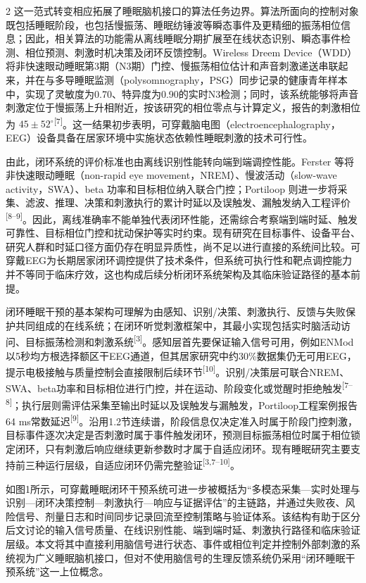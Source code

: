 \documentclass[UTF8,zihao=5,fontset=none]{ctexart}
\newcommand{\hei}{\CJKfamily{hei}}
\newcommand{\leveltwo}[1]{%
  \par\noindent{\hei\fontsize{10.5pt}{12.6pt}\selectfont\mdseries #1\par}}
\newcommand{\refcite}[1]{\nolinebreak[4]\textsuperscript{[#1]}}
\begin{document}
\begin{multicols}{2}
这一范式转变相应拓展了睡眠脑机接口的算法任务边界。算法所面向的控制对象既包括睡眠阶段，也包括慢振荡、睡眠纺锤波等瞬态事件及更精细的振荡相位信息；因此，相关算法的功能需从离线睡眠分期扩展至在线状态识别、瞬态事件检测、相位预测、刺激时机决策及闭环反馈控制。Wireless Dreem Device（WDD）将非快速眼动睡眠第3期（N3期）门控、慢振荡相位估计和声音刺激递送串联起来，并在与多导睡眠监测（polysomnography，PSG）同步记录的健康青年样本中，实现了灵敏度为0.70、特异度为0.90的实时N3检测；同时，该系统能够将声音刺激定位于慢振荡上升相附近，按该研究的相位零点与计算定义，报告的刺激相位为 $45\pm52^{\circ}$\refcite{7}。这一结果初步表明，可穿戴脑电图（electroencephalography，EEG）设备具备在居家环境中实施状态依赖性睡眠刺激的技术可行性。

由此，闭环系统的评价标准也由离线识别性能转向端到端调控性能。Ferster 等将非快速眼动睡眠（non-rapid eye movement，NREM）、慢波活动（slow-wave activity，SWA）、beta 功率和目标相位纳入联合门控；Portiloop 则进一步将采集、滤波、推理、决策和刺激执行的累计时延以及误触发、漏触发纳入工程评价\refcite{8--9}。因此，离线准确率不能单独代表闭环性能，还需综合考察端到端时延、触发可靠性、目标相位门控和扰动保护等实时约束。现有研究在目标事件、设备平台、研究人群和时延口径方面仍存在明显异质性，尚不足以进行直接的系统间比较。可穿戴EEG为长期居家闭环调控提供了技术条件，但系统可执行性和靶点调控能力并不等同于临床疗效，这也构成后续分析闭环系统架构及其临床验证路径的基本前提。

\leveltwo{1.3 闭环睡眠干预系统的基本架构}

闭环睡眠干预的基本架构可理解为由感知、识别/决策、刺激执行、反馈与失败保护共同组成的在线系统；在闭环听觉刺激框架中，其最小实现包括实时脑活动访问、目标振荡检测和刺激系统\refcite{3}。感知层首先要保证输入信号可用，例如ENMod以5秒均方根选择额区干EEG通道，但其居家研究中约30\%数据集仍无可用EEG，提示电极接触与质量控制会直接限制后续环节\refcite{10}。识别/决策层可联合NREM、SWA、beta功率和目标相位进行门控，并在运动、阶段变化或觉醒时拒绝触发\refcite{7--8}；执行层则需评估采集至输出时延以及误触发与漏触发，Portiloop工程案例报告64 ms常数延迟\refcite{9}。沿用1.2节连续谱，阶段信息仅决定准入时属于阶段门控刺激，目标事件逐次决定是否刺激时属于事件触发闭环，预测目标振荡相位时属于相位锁定闭环，只有刺激后响应继续更新参数时才属于自适应闭环。现有睡眠研究主要支持前三种运行层级，自适应闭环仍需完整验证\refcite{3,7--10}。

如图1所示，可穿戴睡眠闭环干预系统可进一步被概括为“多模态采集—实时处理与识别—闭环决策控制—刺激执行—响应与证据评估”的主链路，并通过失败夜、风险信号、剂量日志和时间同步记录回流至控制策略与验证体系。该结构有助于区分后文讨论的输入信号质量、在线识别性能、端到端时延、刺激执行路径和临床验证层级。本文将其中直接利用脑信号进行状态、事件或相位判定并控制外部刺激的系统视为广义睡眠脑机接口，但对不使用脑信号的生理反馈系统仍采用“闭环睡眠干预系统”这一上位概念。\par


\end{multicols}
\end{document}
